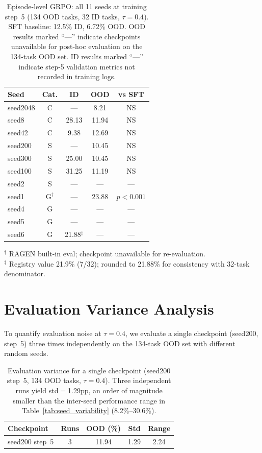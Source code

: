 \begin{table}[h]
\centering
\caption{Episode-level GRPO: all 11 seeds at training step~5 (134 OOD tasks, 32 ID tasks, $\tau{=}0.4$). SFT baseline: 12.5\% ID, 6.72\% OOD. OOD results marked ``---'' indicate checkpoints unavailable for post-hoc evaluation on the 134-task OOD set. ID results marked ``---'' indicate step-5 validation metrics not recorded in training logs.}
\label{tab:step5_unified}
\small
\setlength{\tabcolsep}{4pt}
\begin{tabular}{@{}lcccc@{}}
\toprule
\textbf{Seed} & \textbf{Cat.} & \textbf{ID} & \textbf{OOD} & \textbf{vs SFT} \\
\midrule
seed2048 & C & --- & 8.21 & NS \\
seed8 & C & 28.13 & 11.94 & NS \\
seed42 & C & 9.38 & 12.69 & NS \\
\midrule
seed200 & S & --- & 10.45 & NS \\
seed300 & S & 25.00 & 10.45 & NS \\
seed100 & S & 31.25 & 11.19 & NS \\
seed2 & S & --- & --- & --- \\
\midrule
seed1 & G$^\dagger$ & --- & 23.88 & $p{<}0.001$ \\
seed4 & G & --- & --- & --- \\
seed5 & G & --- & --- & --- \\
seed6 & G & 21.88$^\ddagger$ & --- & --- \\
\bottomrule
\end{tabular}
\begin{flushleft}
\small $^\dagger$ RAGEN built-in eval; checkpoint unavailable for re-evaluation. \\
\small $^\ddagger$ Registry value 21.9\% (7/32); rounded to 21.88\% for consistency with 32-task denominator.
\end{flushleft}
\end{table}

\section{Evaluation Variance Analysis}
\label{app:eval_variance}

To quantify evaluation noise at $\tau{=}0.4$, we evaluate a single checkpoint (seed200, step~5) three times independently on the 134-task OOD set with different random seeds.

\begin{table}[h]
\centering
\caption{Evaluation variance for a single checkpoint (seed200 step~5, 134 OOD tasks, $\tau{=}0.4$). Three independent runs yield std$=$1.29pp, an order of magnitude smaller than the inter-seed performance range in Table~\ref{tab:seed_variability} (8.2\%--30.6\%).}
\label{tab:eval_variance}
\small
\setlength{\tabcolsep}{3pt}
\begin{tabular}{@{}lcccc@{}}
\toprule
\textbf{Checkpoint} & \textbf{Runs} & \textbf{OOD (\%)} & \textbf{Std} & \textbf{Range} \\
\midrule
seed200 step~5 & 3 & 11.94 & 1.29 & 2.24 \\
\bottomrule
\end{tabular}
\end{table}

